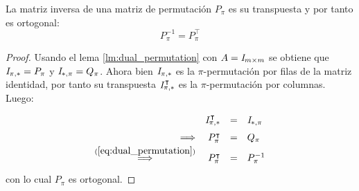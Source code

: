 \begin{lemma}\label{lm:inverse_permutation}
	La matriz inversa de una matriz de permutaci\'on $P_\pi$ es su transpuesta y por tanto es ortogonal:
	\begin{equation}
		P_\pi^{-1} = P_\pi^\intercal
	\end{equation}
\end{lemma}
\begin{proof}
	Usando el lema \ref{lm:dual_permutation} con $A = \mathbb{\mathit{I}}_{m \times m}$ se obtiene que $\mathbb{\mathit{I}}_{\pi,\ast} = P_\pi$ y $\mathbb{\mathit{I}}_{\ast,\pi} = Q_\pi$. Ahora bien $\mathbb{\mathit{I}}_{\pi,\ast}$ es la $\pi$-permutaci\'on por filas de la matriz identidad, por tanto su transpuesta $\mathbb{\mathit{I}}_{\pi,\ast}^\intercal$ es la $\pi$-permutaci\'on por columnas. Luego:
	\begin{equation*}
		\def\arraystretch{1.5}
		\begin{array}{rrcl}
			&\I_{\pi,\ast}^\intercal &=& \I_{\ast,\pi}\\
			\Longrightarrow&P_\pi^\intercal &=& Q_\pi\\
			\overset{(\ref{eq:dual_permutation})}{\Longrightarrow}&P_\pi^\intercal &=& P_\pi^{-1}\\
		\end{array}
	\end{equation*}
	con lo cual $P_\pi$ es ortogonal.
\end{proof}

